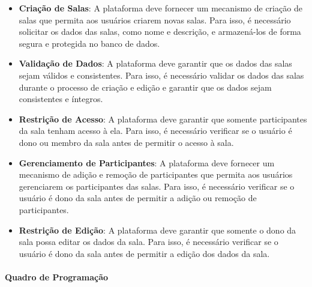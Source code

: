 \begin{itemize}
    \item \textbf{Criação de Salas}: A plataforma deve fornecer um mecanismo de criação de salas que permita aos usuários criarem novas salas. Para isso, é necessário solicitar os dados das salas, como nome e descrição, e armazená-los de forma segura e protegida no banco de dados.
    \item \textbf{Validação de Dados}: A plataforma deve garantir que os dados das salas sejam válidos e consistentes. Para isso, é necessário validar os dados das salas durante o processo de criação e edição e garantir que os dados sejam consistentes e íntegros.
    \item \textbf{Restrição de Acesso}: A plataforma deve garantir que somente participantes da sala tenham acesso à ela. Para isso, é necessário verificar se o usuário é dono ou membro da sala antes de permitir o acesso à sala.
    \item \textbf{Gerenciamento de Participantes}: A plataforma deve fornecer um mecanismo de adição e remoção de participantes que permita aos usuários gerenciarem os participantes das salas. Para isso, é necessário verificar se o usuário é dono da sala antes de permitir a adição ou remoção de participantes.
    \item \textbf{Restrição de Edição}: A plataforma deve garantir que somente o dono da sala possa editar os dados da sala. Para isso, é necessário verificar se o usuário é dono da sala antes de permitir a edição dos dados da sala.
\end{itemize}

\paragraph{Quadro de Programação}

